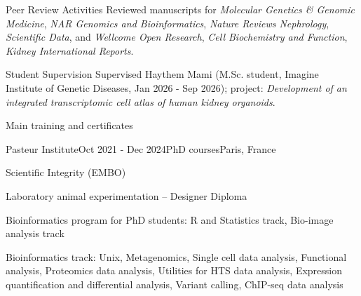 \documentclass[
	11pt, %
]{resume} %
\begin{document}

\begin{rSection}{Peer Review Activities}
Reviewed manuscripts for  \textit{Molecular Genetics \& Genomic Medicine}, \textit{NAR Genomics and Bioinformatics}, \textit{Nature Reviews Nephrology}, \textit{Scientific Data}, and \textit{Wellcome Open Research}, \textit{Cell Biochemistry and Function}, \textit{Kidney International Reports}.
\end{rSection}

\begin{rSection}{Student Supervision}
Supervised Haythem Mami (M.Sc. student, Imagine Institute of Genetic Diseases, Jan 2026 - Sep 2026); project: \textit{Development of an integrated transcriptomic cell atlas of human kidney organoids}.
\end{rSection}



\begin{rSection}{Main training and certificates}

	\begin{rSubsection}{Pasteur Institute}{Oct 2021 - Dec 2024}{PhD courses}{Paris, France}
		\item Scientific Integrity (EMBO)
		\item Laboratory animal experimentation – Designer Diploma
		\item Bioinformatics program for PhD students: R and Statistics track, Bio-image
analysis track
		\item Bioinformatics track: Unix, Metagenomics, Single cell data analysis, Functional analysis, Proteomics data
analysis, Utilities for HTS data analysis, Expression quantification and differential analysis, Variant
calling, ChIP-seq data analysis
	\end{rSubsection}
	
\end{rSection}
\end{document}
